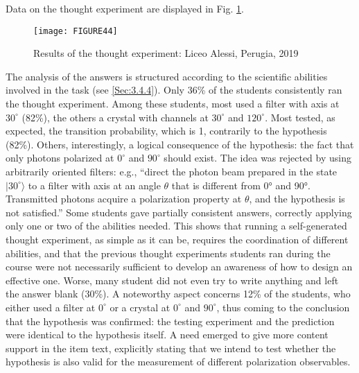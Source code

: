 \documentclass[twocolumn,secnumarabic,amssymb, nobibnotes, aps, prd, nofootinbib]{revtex4-2}
\begin{document}
Data on the thought experiment are displayed in Fig. \ref{FIG:44}.
\begin{figure}[!htpb]
    \texttt{[image: FIGURE44]}
    \caption{Results of the thought experiment: Liceo Alessi, Perugia, 2019}
    \label{FIG:44}
\end{figure}
The analysis of the answers is structured according to the scientific abilities involved in the task (see \ref{Sec:3.4.4}). Only 36\% of the students consistently ran the thought experiment. Among these students, most used a filter with axis at $30^{\circ}$ (82\%), the others a crystal with channels at $30^{\circ}$ and $120^{\circ}$. Most tested, as expected, the transition probability, which is 1, contrarily to the hypothesis (82\%). Others, interestingly, a logical consequence of the hypothesis: the fact that only photons polarized at $0^{\circ}$ and $90^{\circ}$ should exist. The idea was rejected by using arbitrarily oriented filters: e.g., ``direct the photon beam prepared in the state $|30^{\circ}\rangle$ to a filter with axis at an angle $\theta$ that is different from 0° and 90°. Transmitted photons acquire a polarization property at $\theta$, and the hypothesis is not satisfied.'' Some students gave partially consistent answers, correctly applying only one or two of the abilities needed. This shows that running a self-generated thought experiment, as simple as it can be, requires the coordination of different abilities, and that the previous thought experiments students ran during the course were not necessarily sufficient to develop an awareness of how to design an effective one. Worse, many student did not even try to write anything and left the answer blank (30\%). A noteworthy aspect concerns 12\% of the students, who either used a filter at $0^{\circ}$ or a crystal at $0^{\circ}$ and $90^{\circ}$, thus coming to the conclusion that the hypothesis was confirmed: the testing experiment and the prediction were identical to the hypothesis itself. A need emerged to give more content support in the item text, explicitly stating that we intend to test whether the hypothesis is also valid for the measurement of different polarization observables.
\end{document}
